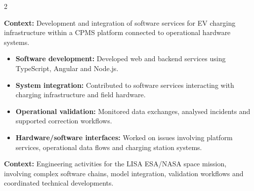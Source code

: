 \documentclass[8pt,a4paper,ragged2e,withhyper]{altacv}
\begin{document}



\makecvheader

\vspace{-0.3cm}


\begin{paracol}{2}



\textbf{Context:} Development and integration of software services for EV charging infrastructure within a CPMS platform connected to operational hardware systems.

\begin{itemize}
\item \textbf{Software development:} Developed web and backend services using TypeScript, Angular and Node.js.
\item \textbf{System integration:} Contributed to software services interacting with charging infrastructure and field hardware.
\item \textbf{Operational validation:} Monitored data exchanges, analysed incidents and supported correction workflows.
\item \textbf{Hardware/software interfaces:} Worked on issues involving platform services, operational data flows and charging station systems.
\end{itemize}

\divider


\textbf{Context:} Engineering activities for the LISA ESA/NASA space mission, involving complex software chains, model integration, validation workflows and coordinated technical developments.


\end{paracol}
\end{document}
